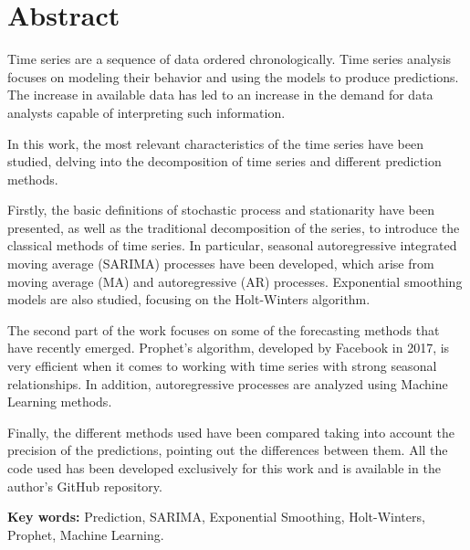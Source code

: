 \documentclass[12pt,twoside]{article}
\begin{document}


\newpage
\section*{Abstract}
Time series are a sequence of data ordered chronologically. Time series analysis focuses on modeling their behavior and using the models to produce predictions. The increase in available data has led to an increase in the demand for data analysts capable of interpreting such information. 

In this work, the most relevant characteristics of the time series have been studied, delving into the decomposition of time series and different prediction methods.

Firstly, the basic definitions of stochastic process and stationarity have been presented, as well as the traditional decomposition of the series, to introduce the classical methods of time series. In particular, seasonal autoregressive integrated moving average (SARIMA) processes have been developed, which arise from moving average (MA) and autoregressive (AR) processes. Exponential smoothing models are also studied, focusing on the Holt-Winters algorithm.

The second part of the work focuses on some of the forecasting methods that have recently emerged. Prophet's algorithm, developed by Facebook in 2017, is very efficient when it comes to working with time series with strong seasonal relationships. In addition, autoregressive processes are analyzed using Machine Learning methods.

Finally, the different methods used have been compared taking into account the precision of the predictions, pointing out the differences between them. All the code used has been developed exclusively for this work and is available in the author's GitHub repository.

\textbf{Key words:} Prediction, SARIMA, Exponential Smoothing, Holt-Winters, Prophet, Machine Learning.





\newpage
\tableofcontents

\end{document}
